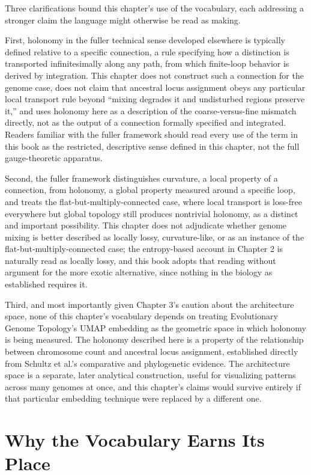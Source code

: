 \documentclass[11pt]{book}
\begin{document}
Three clarifications bound this chapter's use of the vocabulary, each addressing a stronger claim the language might otherwise be read as making.

First, holonomy in the fuller technical sense developed elsewhere is typically defined relative to a specific connection, a rule specifying how a distinction is transported infinitesimally along any path, from which finite-loop behavior is derived by integration. This chapter does not construct such a connection for the genome case, does not claim that ancestral locus assignment obeys any particular local transport rule beyond ``mixing degrades it and undisturbed regions preserve it,'' and uses holonomy here as a description of the coarse-versus-fine mismatch directly, not as the output of a connection formally specified and integrated. Readers familiar with the fuller framework should read every use of the term in this book as the restricted, descriptive sense defined in this chapter, not the full gauge-theoretic apparatus.

Second, the fuller framework distinguishes curvature, a local property of a connection, from holonomy, a global property measured around a specific loop, and treats the flat-but-multiply-connected case, where local transport is loss-free everywhere but global topology still produces nontrivial holonomy, as a distinct and important possibility. This chapter does not adjudicate whether genome mixing is better described as locally lossy, curvature-like, or as an instance of the flat-but-multiply-connected case; the entropy-based account in Chapter 2 is naturally read as locally lossy, and this book adopts that reading without argument for the more exotic alternative, since nothing in the biology as established requires it.

Third, and most importantly given Chapter 3's caution about the architecture space, none of this chapter's vocabulary depends on treating Evolutionary Genome Topology's UMAP embedding as the geometric space in which holonomy is being measured. The holonomy described here is a property of the relationship between chromosome count and ancestral locus assignment, established directly from Schultz et al.'s comparative and phylogenetic evidence. The architecture space is a separate, later analytical construction, useful for visualizing patterns across many genomes at once, and this chapter's claims would survive entirely if that particular embedding technique were replaced by a different one.

\section{Why the Vocabulary Earns Its Place}
\end{document}

